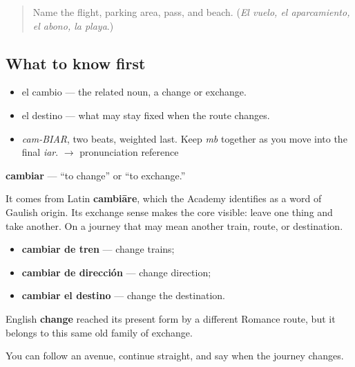 \label{lesson:ES-C401-cambiar}



\begin{quote}
Name the flight, parking area, pass, and beach. (\emph{El vuelo, el aparcamiento, el abono, la playa}.)
\end{quote}

\subsection*{What to know first}
\begin{itemize}
\raggedright
  \item el cambio — the related noun, a change or exchange.
  \item el destino — what may stay fixed when the route changes.
\end{itemize}

\begin{sounds}
\begin{itemize}
\raggedright
  \item \emph{cam-BIAR}, two beats, weighted last. Keep \emph{mb} together as you move into the final \emph{iar}. $\to$ pronunciation reference
\end{itemize}
\end{sounds}

\begin{cousinweb}
\textbf{cambiar} — \textquotedblleft{}to change\textquotedblright{} or \textquotedblleft{}to exchange.\textquotedblright{}

It comes from Latin \textbf{cambiāre}, which the Academy identifies as a word of Gaulish origin. Its exchange sense makes the core visible: leave one thing and take another. On a journey that may mean another train, route, or destination.

\begin{itemize}
\raggedright
  \item \textbf{cambiar de tren} — change trains;
  \item \textbf{cambiar de dirección} — change direction;
  \item \textbf{cambiar el destino} — change the destination.
\end{itemize}

English \textbf{change} reached its present form by a different Romance route, but it belongs to this same old family of exchange.
\end{cousinweb}

\begin{grammarlens}[title={What you've built}]
You can follow an avenue, continue straight, and say when the journey changes.
\end{grammarlens}

